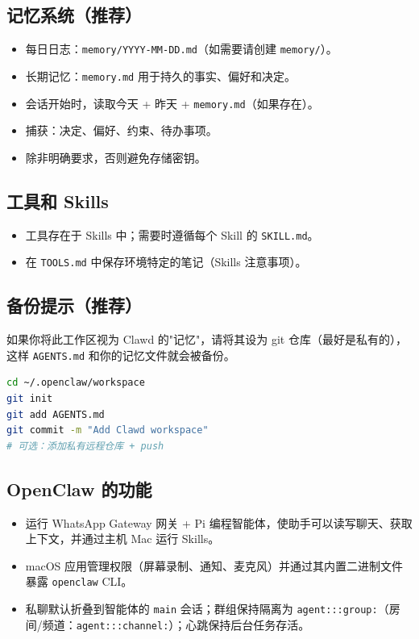 \subsection{记忆系统（推荐）}


\begin{itemize}
  \item 每日日志：\texttt{memory/YYYY-MM-DD.md}（如需要请创建 \texttt{memory/}）。
  \item 长期记忆：\texttt{memory.md} 用于持久的事实、偏好和决定。
  \item 会话开始时，读取今天 + 昨天 + \texttt{memory.md}（如果存在）。
  \item 捕获：决定、偏好、约束、待办事项。
  \item 除非明确要求，否则避免存储密钥。
\end{itemize}


\subsection{工具和 Skills}


\begin{itemize}
  \item 工具存在于 Skills 中；需要时遵循每个 Skill 的 \texttt{SKILL.md}。
  \item 在 \texttt{TOOLS.md} 中保存环境特定的笔记（Skills 注意事项）。
\end{itemize}


\subsection{备份提示（推荐）}


如果你将此工作区视为 Clawd 的"记忆"，请将其设为 git 仓库（最好是私有的），这样 \texttt{AGENTS.md} 和你的记忆文件就会被备份。

\begin{lstlisting}[language=bash]
cd ~/.openclaw/workspace
git init
git add AGENTS.md
git commit -m "Add Clawd workspace"
# 可选：添加私有远程仓库 + push
\end{lstlisting}


\subsection{OpenClaw 的功能}


\begin{itemize}
  \item 运行 WhatsApp Gateway 网关 + Pi 编程智能体，使助手可以读写聊天、获取上下文，并通过主机 Mac 运行 Skills。
  \item macOS 应用管理权限（屏幕录制、通知、麦克风）并通过其内置二进制文件暴露 \texttt{openclaw} CLI。
  \item 私聊默认折叠到智能体的 \texttt{main} 会话；群组保持隔离为 \texttt{agent:::group:}（房间/频道：\texttt{agent:::channel:}）；心跳保持后台任务存活。
\end{itemize}


